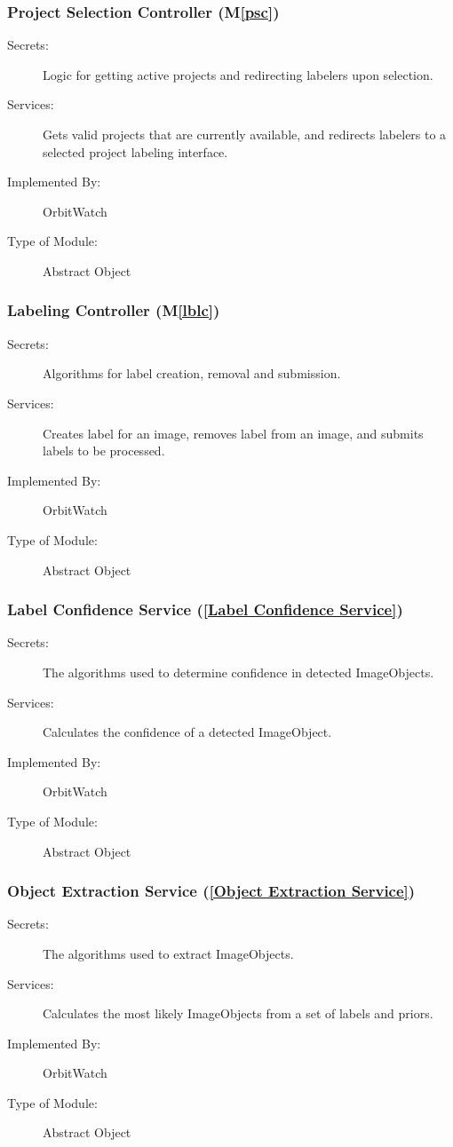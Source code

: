 \documentclass[12pt, titlepage]{article}
\newcommand{\mref}[1]{M\ref{#1}}
\begin{document}
\subsubsection{Project Selection Controller (\mref{psc})}

\begin{description}
\item[Secrets:] Logic for getting active projects and redirecting labelers upon selection.
\item[Services:] Gets valid projects that are currently available, and redirects labelers to a selected project labeling interface.
\item[Implemented By:] OrbitWatch
\item[Type of Module:] Abstract Object
\end{description}

\subsubsection{Labeling Controller (\mref{lblc})}

\begin{description}
\item[Secrets:] Algorithms for label creation, removal and submission.
\item[Services:] Creates label for an image, removes label from an image, and submits labels to be processed.
\item[Implemented By:] OrbitWatch
\item[Type of Module:] Abstract Object
\end{description}


\subsubsection{Label Confidence Service (\ref{Label Confidence Service})}
\begin{description}
\item[Secrets:] The algorithms used to determine confidence in detected ImageObjects.
\item[Services:] Calculates the confidence of a detected ImageObject.
\item[Implemented By:] OrbitWatch
\item[Type of Module:] Abstract Object
\end{description}

\subsubsection{Object Extraction Service (\ref{Object Extraction Service})}
\begin{description}
\item[Secrets:] The algorithms used to extract ImageObjects.
\item[Services:] Calculates the most likely ImageObjects from a set of labels and priors.
\item[Implemented By:] OrbitWatch
\item[Type of Module:] Abstract Object
\end{description}
\end{document}
